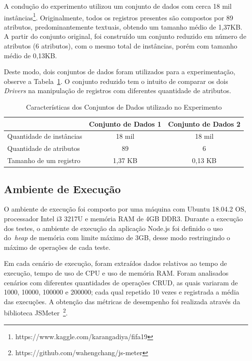 \documentclass[12pt]{article}
\begin{document}
A condução do experimento utilizou um conjunto de dados com cerca 18 mil instâncias\footnote{https://www.kaggle.com/karangadiya/fifa19}. 
Originalmente, todos os registros presentes são compostos por 89 atributos, predominantemente textuais, obtendo um tamanho médio de 1,37KB. 
A partir do conjunto original, foi construído um conjunto reduzido em número de atributos (6 atributos), com o mesmo total de instâncias, porém com tamanho médio de 0,13KB. 

Deste modo, dois conjuntos de dados foram utilizados para a experimentação, observe a Tabela~\ref{tab:conjunto-dados}. 
O conjunto reduzido tem o intuito de comparar os dois \emph{Drivers} na manipulação de registros com diferentes quantidade de atributos.

\begin{table}[ht]
\centering
\caption{Características dos Conjuntos de Dados utilizado no Experimento}
\label{tab:conjunto-dados}
\begin{tabular}{c|c|c|}
\cline{2-3}
                         & \textbf{Conjunto de Dados 1} & \textbf{Conjunto de Dados 2} \\ \hline
\multicolumn{1}{|l|}{Quantidade de instâncias} & 18 mil   		 			& 18 mil            \\ \hline
\multicolumn{1}{|l|}{Quantidade de atributos}  & 89        		 			& 6                  \\ \hline
\multicolumn{1}{|l|}{Tamanho de um registro}   & 1,37 KB        				& 0,13 KB                    \\ \hline
\end{tabular}
\end{table}

\subsection{Ambiente de Execução}

O ambiente de execução foi composto por uma máquina com Ubuntu 18.04.2 OS, processador Intel i3 3217U e memória RAM de 4GB DDR3. 
Durante a execução dos testes, o ambiente de execução da aplicação Node.js foi definido o uso do~\emph{heap} de memória com limite máximo de 3GB, desse modo restringindo o máximo de operações de cada teste.

Em cada cenário de execução, foram extraídos dados relativos ao tempo de execução, tempo de uso de CPU e uso de memória RAM. 
Foram analisados cenários com diferentes quantidades de operações CRUD, as quais variaram de 1000, 10000, 100000 e 200000; cada qual repetido 10 vezes e registrada a média das execuções. A obtenção das métricas de desempenho foi realizada através da biblioteca JSMeter~\footnote{https://github.com/wahengchang/js-meter}. 
\end{document}
